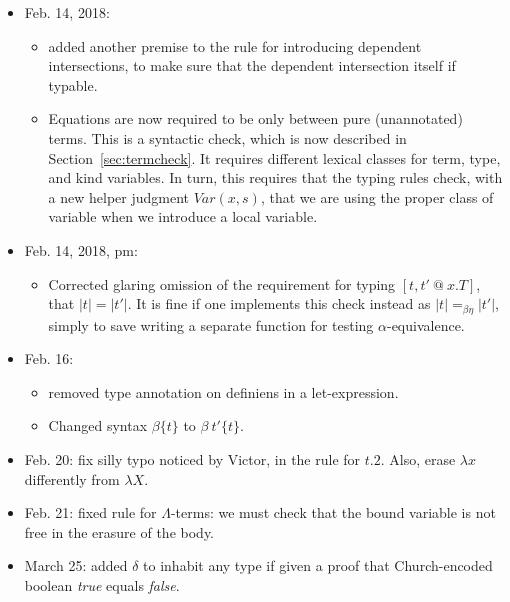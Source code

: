 \documentclass{article}
\begin{document}
\begin{itemize}
\item Feb. 14, 2018:
  \begin{itemize}
  \item added another premise to the rule for introducing dependent intersections, to
    make sure that the dependent intersection itself if typable.
  \item Equations are now required to be only between pure
    (unannotated) terms.  This is a syntactic check, which is now
    described in Section~\ref{sec:termcheck}.  It requires different
    lexical classes for term, type, and kind variables.  In turn, this
    requires that the typing rules check, with a new helper judgment
    $\textit{Var}(x,s)$, that we are using the proper class of
    variable when we introduce a local variable.
   
  \end{itemize}
\item Feb. 14, 2018, pm:
  \begin{itemize}
  \item Corrected glaring omission of the requirement for typing $[t,t'\ @\ x.T]$, that $|t| = |t'|$.  It is fine if one implements
    this check instead as $|t| =_{\beta\eta} |t'|$, simply to save writing a separate function for testing $\alpha$-equivalence. 
  \end{itemize}
\item Feb. 16:
  \begin{itemize}
  \item removed type annotation on definiens in a let-expression.
  \item Changed syntax $\beta\{t\}$ to $\beta\ t'\{t\}$.
    \end{itemize}
\item Feb. 20: fix silly typo noticed by Victor, in the rule for $t.2$.  Also, erase $\lambda x$ differently from $\lambda X$.

\item Feb. 21: fixed rule for $\Lambda$-terms: we must check that the bound variable is not free in the erasure of the body.
\item March 25: added $\delta$ to inhabit any type if given a proof that Church-encoded boolean \emph{true} equals \emph{false}.
\end{itemize}
\end{document}
